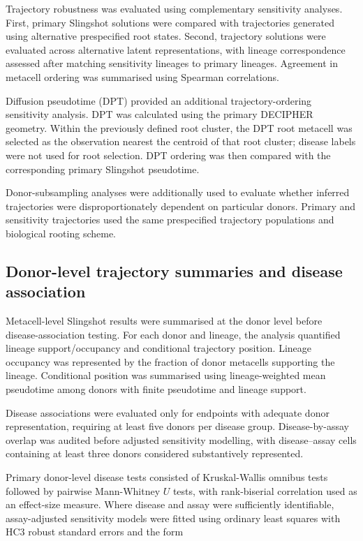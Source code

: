 \documentclass[10pt,letterpaper]{article}
\begin{document}
Trajectory robustness was evaluated using complementary sensitivity analyses. First, primary Slingshot solutions were compared with trajectories generated using alternative prespecified root states. Second, trajectory solutions were evaluated across alternative latent representations, with lineage correspondence assessed after matching sensitivity lineages to primary lineages. Agreement in metacell ordering was summarised using Spearman correlations.

Diffusion pseudotime (DPT) \cite{haghverdiDiffusionPseudotimeRobustly2016} provided an additional trajectory-ordering sensitivity analysis. DPT was calculated using the primary DECIPHER geometry. Within the previously defined root cluster, the DPT root metacell was selected as the observation nearest the centroid of that root cluster; disease labels were not used for root selection. DPT ordering was then compared with the corresponding primary Slingshot pseudotime.

Donor-subsampling analyses were additionally used to evaluate whether inferred trajectories were disproportionately dependent on particular donors. Primary and sensitivity trajectories used the same prespecified trajectory populations and biological rooting scheme.

\subsection*{Donor-level trajectory summaries and disease association}

Metacell-level Slingshot results were summarised at the donor level before disease-association testing. For each donor and lineage, the analysis quantified lineage support/occupancy and conditional trajectory position. Lineage occupancy was represented by the fraction of donor metacells supporting the lineage. Conditional position was summarised using lineage-weighted mean pseudotime among donors with finite pseudotime and lineage support.

Disease associations were evaluated only for endpoints with adequate donor representation, requiring at least five donors per disease group. Disease-by-assay overlap was audited before adjusted sensitivity modelling, with disease--assay cells containing at least three donors considered substantively represented.

Primary donor-level disease tests consisted of Kruskal-Wallis omnibus tests followed by pairwise Mann-Whitney $U$ tests, with rank-biserial correlation used as an effect-size measure. Where disease and assay were sufficiently identifiable, assay-adjusted sensitivity models were fitted using ordinary least squares with HC3 robust standard errors and the form
\end{document}
